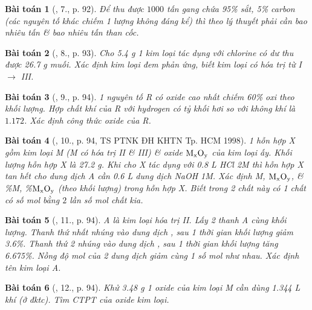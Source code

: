 \documentclass{article}
\newtheorem{baitoan}{Bài toán}
\begin{document}
\begin{baitoan}[\cite{An_Hoa_Hoc_nang_cao_8_9}, 7., p. 92]
	Để thu được $1000$ tấn gang chứa {\rm95\%} sắt, {\rm5\%} carbon (các nguyên tố khác chiếm 1 lượng không đáng kể) thì theo lý thuyết phải cần bao nhiêu tấn {\rm{}} \& bao nhiêu tấn than cốc. 
\end{baitoan}

\begin{baitoan}[\cite{An_Hoa_Hoc_nang_cao_8_9}, 8., p. 93]
	Cho {\rm5.4 g} 1 kim loại tác dụng với chlorine có dư thu được {\rm26.7  g} muối. Xác định kim loại đem phản ứng, biết kim loại có hóa trị từ I $\to$ III.
\end{baitoan}

\begin{baitoan}[\cite{An_Hoa_Hoc_nang_cao_8_9}, 9., p. 94]
	1 nguyên tố R có oxide cao nhất chiếm {\rm60\%} oxi theo khối lượng. Hợp chất khí của R với hydrogen có tỷ khối hơi so với không khí là $1.172$. Xác định công thức oxide của R.
\end{baitoan}

\begin{baitoan}[\cite{An_Hoa_Hoc_nang_cao_8_9}, 10., p. 94, TS PTNK ĐH KHTN Tp. HCM 1998]
	1 hỗn hợp X gồm kim loại {\rm M} ({\rm M} có hóa trị II \& III) \& oxide $\rm M_xO_y$ của kim loại ấy. Khối lượng hỗn hợp X là {\rm27.2 g}. Khi cho X tác dụng với {\rm0.8 L HCl 2M} thì hỗn hợp X tan hết cho dung dịch A cần {\rm0.6 L} dung dịch {\rm NaOH 1M}. Xác định {\rm M}, $\rm M_xO_y$, \& {\rm\%M, \%$\rm M_xO_y$} (theo khối lượng) trong hỗn hợp X. Biết trong 2 chất này có 1 chất có số mol bằng $2$ lần số mol chất kia.
\end{baitoan}

\begin{baitoan}[\cite{An_Hoa_Hoc_nang_cao_8_9}, 11., p. 94]
	A là kim loại hóa trị II. Lấy 2 thanh A cùng khối lượng. Thanh thứ nhất nhúng vào dung dịch {\rm{}}, sau 1 thời gian khối lượng giảm {\rm3.6\%}. Thanh thứ 2 nhúng vào dung dịch {\rm{}}, sau 1 thời gian khối lượng tăng {\rm6.675\%}. Nồng độ mol của 2 dung dịch {\rm{}} giảm cùng 1 số mol như nhau. Xác định tên kim loại A.
\end{baitoan}

\begin{baitoan}[\cite{An_Hoa_Hoc_nang_cao_8_9}, 12., p. 94]
	Khử {\rm3.48 g} 1 oxide của kim loại M cần dùng {\rm1.344 L} khí {\rm{}} (ở đktc). Tìm {\rm CTPT} của oxide kim loại.
\end{baitoan}
\end{document}
